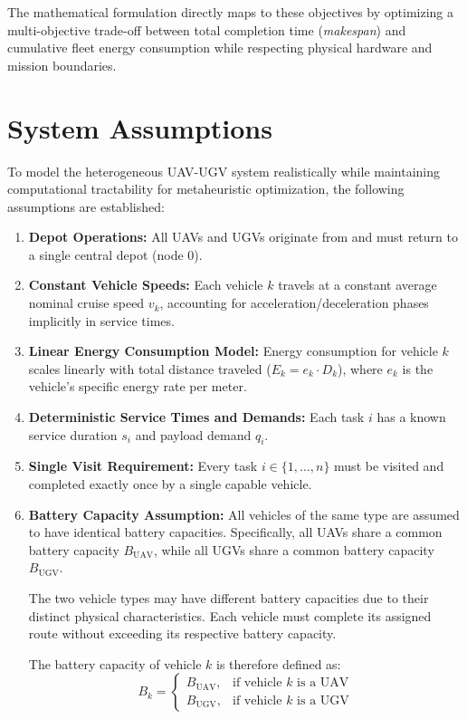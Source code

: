 The mathematical formulation directly maps to these objectives by optimizing a multi-objective trade-off between total completion time (\textit{makespan}) and cumulative fleet energy consumption while respecting physical hardware and mission boundaries.

\section{System Assumptions}
To model the heterogeneous UAV-UGV system realistically while maintaining computational tractability for metaheuristic optimization, the following assumptions are established:
\begin{enumerate}
    \item \textbf{Depot Operations:} All UAVs and UGVs originate from and must return to a single central depot (node $0$).
    \item \textbf{Constant Vehicle Speeds:} Each vehicle $k$ travels at a constant average nominal cruise speed $v_k$, accounting for acceleration/deceleration phases implicitly in service times.
    \item \textbf{Linear Energy Consumption Model:} Energy consumption for vehicle $k$ scales linearly with total distance traveled ($E_k = e_k \cdot D_k$), where $e_k$ is the vehicle's specific energy rate per meter.
    \item \textbf{Deterministic Service Times and Demands:} Each task $i$ has a known service duration $s_i$ and payload demand $q_i$.
    \item \textbf{Single Visit Requirement:} Every task $i \in \{1, \dots, n\}$ must be visited and completed exactly once by a single capable vehicle.

    \item \textbf{Battery Capacity Assumption:}
    All vehicles of the same type are assumed to have identical battery capacities. Specifically, all UAVs share a common battery capacity $B_{\text{UAV}}$, while all UGVs share a common battery capacity $B_{\text{UGV}}$.

    The two vehicle types may have different battery capacities due to their distinct physical characteristics. Each vehicle must complete its assigned route without exceeding its respective battery capacity.

    The battery capacity of vehicle $k$ is therefore defined as:
    \begin{equation}
        B_k =
        \begin{cases}
            B_{\text{UAV}}, & \text{if vehicle } k \text{ is a UAV} \\
            B_{\text{UGV}}, & \text{if vehicle } k \text{ is a UGV}
        \end{cases}
    \end{equation}

\end{enumerate}

